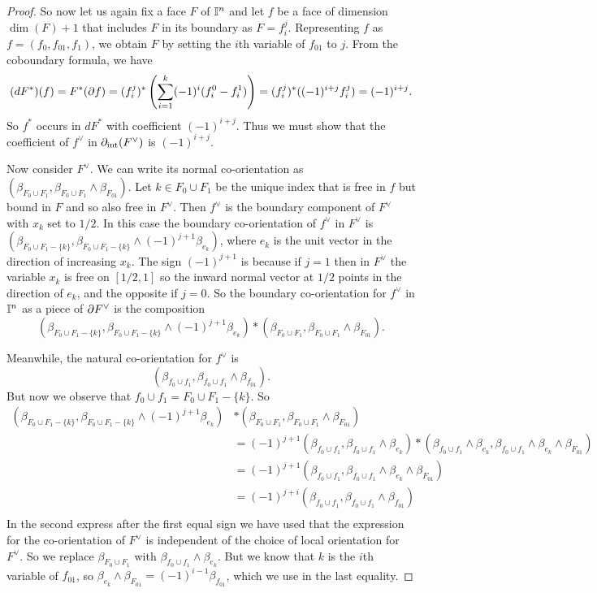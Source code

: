 \begin{proof}
So now let us again fix a face $F$ of $\mathbb{I}^n$ and let $f$ be a face of dimension $\dim(F)+1$ that includes $F$ in its boundary as $F=f_i^j$. Representing $f$ as $f=(f_0,f_{01},f_1)$, we obtain $F$ by setting the $i$th variable of $f_{01}$ to $j$. From the coboundary formula, we have 
\begin{equation*}
(dF^*)(f)=F^*(\partial f)=(f_i^j)^*\left(\sum_{i=1}^k (-1)^i(f_i^0-f^1_i)\right)
=(f_i^j)^*((-1)^{i+j}f_i^j)=(-1)^{i+j}.
\end{equation*}
So 
$f^*$ occurs in $dF^*$ with coefficient $(-1)^{i+j}$. Thus we must show that the coefficient of $f^\vee$ in $\partial_{\text{int}} (F^\vee)$ is $(-1)^{i+j}$.

Now consider $F^\vee$. We can write its normal co-orientation as $(\beta_{F_0\cup F_1},\beta_{F_0\cup F_1}\wedge \beta_{F_{01}})$. Let $k\in F_0\cup F_1$ be the unique index that is free in $f$ but bound in $F$ and so also free in $F^\vee$. Then $f^\vee$ is the boundary component of $F^\vee$ with $x_k$ set to $1/2$. In this case the boundary co-orientation of $f^\vee$ in $F^\vee$ is $(\beta_{F_0\cup F_1-\{k\}},\beta_{F_0\cup F_1-\{k\}}\wedge (-1)^{j+1} \beta_{e_k})$, where $e_k$ is the unit vector in the direction of increasing $x_k$. The sign $(-1)^{j+1}$ is because if $j=1$ then in $F^\vee$ the variable $x_k$ is free on $[1/2,1]$ so the inward normal vector at $1/2$ points in the direction of $e_k$, and the opposite if $j=0$. So the boundary co-orientation for $f^\vee$ in $\mathbb{I}^n$ as a piece of $\partial F^\vee$ is the composition $$(\beta_{F_0\cup F_1-\{k\}},\beta_{F_0\cup F_1-\{k\}}\wedge (-1)^{j+1} \beta_{e_k})*(\beta_{F_0\cup F_1},\beta_{F_0\cup F_1}\wedge \beta_{F_{01}}).$$

Meanwhile, the natural co-orientation for $f^\vee$ is $$(\beta_{f_0\cup f_1},\beta_{f_0\cup f_1}\wedge \beta_{f_{01}}).$$ But now we observe that $f_0\cup f_1=F_0\cup F_1-\{k\}$. So 
\begin{align*}
(\beta_{F_0\cup F_1-\{k\}},\beta_{F_0\cup F_1-\{k\}}\wedge (-1)^{j+1} \beta_{e_k})&*(\beta_{F_0\cup F_1},\beta_{F_0\cup F_1}\wedge \beta_{F_{01}})\\
&=(-1)^{j+1}(\beta_{f_0\cup f_1},\beta_{f_0\cup f_1}\wedge  \beta_{e_k})*(\beta_{f_0\cup f_1}\wedge  \beta_{e_k},\beta_{f_0\cup f_1}\wedge  \beta_{e_k}\wedge \beta_{F_{01}})\\
&=(-1)^{j+1}(\beta_{f_0\cup f_1},\beta_{f_0\cup f_1}\wedge  \beta_{e_k}\wedge \beta_{F_{01}})\\
&=(-1)^{j+i}(\beta_{f_0\cup f_1},\beta_{f_0\cup f_1}\wedge \beta_{f_{01}})\\
\end{align*}
In the second express after the first equal sign we have used that the expression for the co-orientation of $F^\vee$ is independent of the choice of local orientation for $F^\vee$. So we replace $\beta_{F_0\cup F_1}$ with $\beta_{f_0\cup f_1}\wedge  \beta_{e_k}$. But we know that $k$ is the $i$th variable of $f_{01}$, so 
$\beta_{e_k}\wedge \beta_{F_{01}}=(-1)^{i-1}\beta_{f_{01}}$, which we use in the last equality. 
\end{proof}


